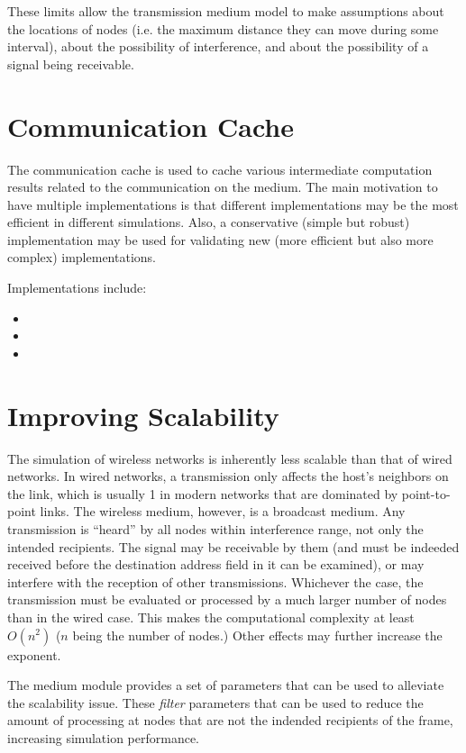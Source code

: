 These limits allow the transmission medium model to make assumptions about the
locations of nodes (i.e. the maximum distance they can move during some
interval), about the possibility of interference, and about the possibility
of a signal being receivable.


\section{Communication Cache}

The communication cache is used to cache various intermediate computation
results related to the communication on the medium. The main motivation to have
multiple implementations is that different implementations may be the most
efficient in different simulations. Also, a conservative (simple but robust)
implementation may be used for validating new (more efficient but also more
complex) implementations.

Implementations include:

\begin{itemize}
  \item {}
  \item {}
  \item {}
\end{itemize}


\section{Improving Scalability}

The simulation of wireless networks is inherently less scalable than
that of wired networks. In wired networks, a transmission only affects 
the host's neighbors on the link, which is usually 1 in modern networks
that are dominated by point-to-point links. The wireless medium, however, 
is a broadcast medium. Any transmission is ``heard'' by all nodes 
within interference range, not only the intended recipients.
The signal may be receivable by them (and must be indeeded received 
before the destination address field in it can be examined), 
or may interfere with the reception of other transmissions.
Whichever the case, the transmission must be evaluated or processed
by a much larger number of nodes than in the wired case. 
This makes the computational complexity at least $O(n^2)$ ($n$ being
the number of nodes.) Other effects may further increase the exponent.

The medium module provides a set of parameters that can be used
to alleviate the scalability issue. These \textit{filter} parameters
that can be used to reduce the amount of processing at nodes that are
not the indended recipients of the frame, increasing simulation performance.

